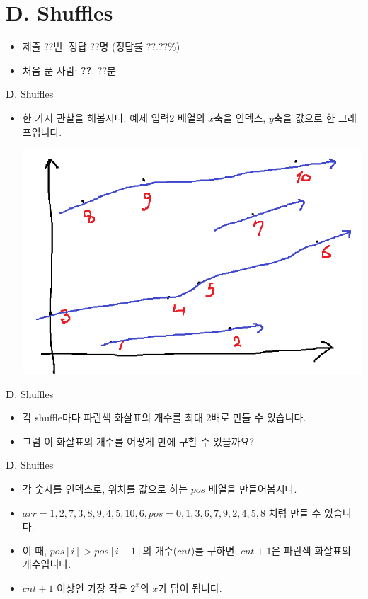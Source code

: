 \section{D. Shuffles}

\begin{frame} %
    \begin{itemize}
        \item 제출 ??번, 정답 ??명 (정답률 ??.??\%)
        \item 처음 푼 사람: \textbf{??}, ??분
    \end{itemize}
\end{frame}

\begin{frame}{\textbf{D}. Shuffles}
    \begin{itemize}
        \item 한 가지 관찰을 해봅시다. 예제 입력2 배열의 $x$축을 인덱스, $y$축을 값으로 한 그래프입니다.
        \begin{center}
            \includegraphics[width=0.6\linewidth]{../images/shuffles.png}
        \end{center}
    \end{itemize}
\end{frame}

\begin{frame}{\textbf{D}. Shuffles}
    \begin{itemize}
        \item 각 shuffle마다 파란색 화살표의 개수를 최대 2배로 만들 수 있습니다.
        \item 그럼 이 화살표의 개수를 어떻게 만에 구할 수 있을까요?
    \end{itemize}
\end{frame}

\begin{frame}{\textbf{D}. Shuffles}
    \begin{itemize}
        \item 각 숫자를 인덱스로, 위치를 값으로 하는 $pos$ 배열을 만들어봅시다.
        \item $arr = 1,2,7,3,8,9,4,5,10,6, pos = 0,1,3,6,7,9,2,4,5,8$ 처럼 만들 수 있습니다.
        \item 이 때, $pos[i] > pos[i+1]$의 개수($cnt$)를 구하면, $cnt+1$은 파란색 화살표의 개수입니다.
        \item $cnt+1$ 이상인 가장 작은 $2^x$의 $x$가 답이 됩니다.
    \end{itemize}
\end{frame}